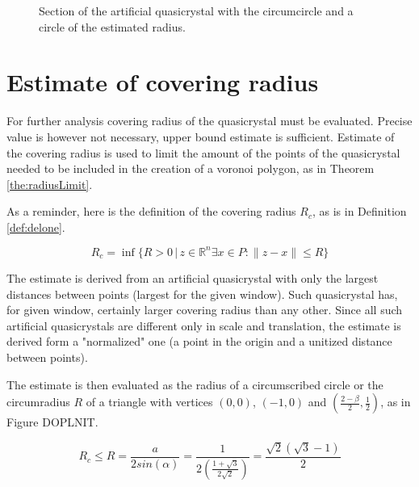 \documentclass[text.tex]{subfiles}
\begin{document}
\begin{figure}[h]
\centering
{}
\caption{Section of the artificial quasicrystal with the circumcircle and a circle of the estimated radius.}
\label{fig:coveringRadius}
\end{figure}



\section{Estimate of covering radius}

For further analysis covering radius of the quasicrystal must be evaluated. 
Precise value is however not necessary, upper bound estimate is sufficient. 
Estimate of the covering radius is used to limit the amount of the points of the quasicrystal needed to be included in the creation of a voronoi polygon, as in Theorem \ref{the:radiusLimit}.

As a reminder, here is the definition of the covering radius $R_c$, as is in Definition \ref{def:delone}.

$$R_c = \inf\{R>0\,|\, z\in\mathbb{R}^n \exists x\in P: \|z-x\|\leq R\}$$

The estimate is derived from an artificial quasicrystal with only the largest distances between points (largest for the given window). Such quasicrystal has, for given window, certainly larger covering radius than any other. Since all such artificial quasicrystals are different only in scale and translation, the estimate is derived form a "normalized" one (a point in the origin and a unitized distance between points).

The estimate is then evaluated as the radius of a circumscribed circle or the circumradius $R$ of a triangle with vertices $(0,0)$, $(-1,0)$ and $\left(\frac{2-\beta}{2},\frac{1}{2}\right)$, as in Figure DOPLNIT. 

$$R_c \leq R = \frac{a}{2sin(\alpha)} = \frac{1}{2\left(\frac{1+\sqrt{3}}{2\sqrt{2}}\right)} = \frac{\sqrt{2}(\sqrt{3}-1)}{2}$$
\end{document}
